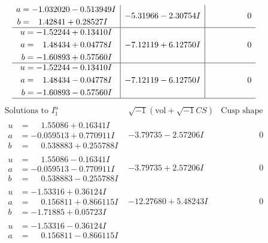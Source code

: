 \documentclass[1p]{elsarticle_modified}
\theoremstyle{definition}
\newcommand{\I}{\sqrt{-1}}
\begin{document}
$$\begin{array}{c|c|c}
\begin{aligned}
a &= -1.032020 - 0.513949 I \\
b &= \phantom{-}1.42841 + 0.28527 I\end{aligned}
 & -5.31966 - 2.30754 I & \phantom{-0.000000 } 0 \\ \hline\begin{aligned}
u &= -1.52244 + 0.13410 I \\
a &= \phantom{-}1.48434 + 0.04778 I \\
b &= -1.60893 + 0.57560 I\end{aligned}
 & -7.12119 + 6.12750 I & \phantom{-0.000000 } 0 \\ \hline\begin{aligned}
u &= -1.52244 - 0.13410 I \\
a &= \phantom{-}1.48434 - 0.04778 I \\
b &= -1.60893 - 0.57560 I\end{aligned}
 & -7.12119 - 6.12750 I & \phantom{-0.000000 } 0\\
 \hline 
 \end{array}$$\newpage$$\begin{array}{c|c|c}  
\text{Solutions to }I^u_{1}& \I (\text{vol} + \sqrt{-1}CS) & \text{Cusp shape}\\
 \hline 
\begin{aligned}
u &= \phantom{-}1.55086 + 0.16341 I \\
a &= -0.059513 + 0.770911 I \\
b &= \phantom{-}0.538883 + 0.255788 I\end{aligned}
 & -3.79735 - 2.57206 I & \phantom{-0.000000 } 0 \\ \hline\begin{aligned}
u &= \phantom{-}1.55086 - 0.16341 I \\
a &= -0.059513 - 0.770911 I \\
b &= \phantom{-}0.538883 - 0.255788 I\end{aligned}
 & -3.79735 + 2.57206 I & \phantom{-0.000000 } 0 \\ \hline\begin{aligned}
u &= -1.53316 + 0.36124 I \\
a &= \phantom{-}0.156811 + 0.866115 I \\
b &= -1.71885 + 0.05723 I\end{aligned}
 & -12.27680 + 5.48243 I & \phantom{-0.000000 } 0 \\ \hline\begin{aligned}
u &= -1.53316 - 0.36124 I \\
a &= \phantom{-}0.156811 - 0.866115 I \\

\end{aligned}
\end{array}$$
\end{document}
